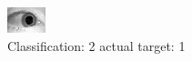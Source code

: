 \begin{figure}[h!]
\begin{center}
\includegraphics[width=0.60\columnwidth]{figures/ID1444_class_2_target_1.png}
\end{center}
\caption{ Classification: 2 actual target: 1}
\label{fig:ID1444_class_2_target_1}
\end{figure}
